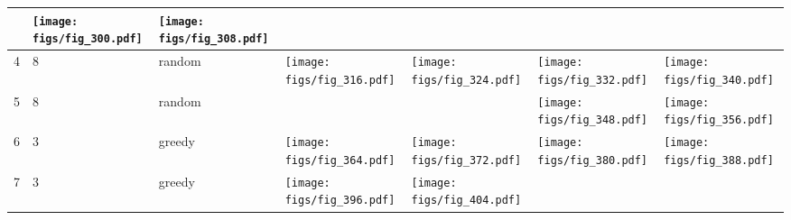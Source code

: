 \documentclass[oneside,canadian,landscape]{article}
\begin{document}
\begin{center}
\begin{longtable}{|l|l|l||l|l|l|l|}
\begin{minipage}{3.5cm}
\end{minipage}
&\begin{minipage}{3.5cm}
\texttt{[image: figs/fig\_300.pdf]}
\end{minipage}
&\begin{minipage}{3.5cm}
\texttt{[image: figs/fig\_308.pdf]}
\end{minipage}
\\ \hline
4&8&random&\begin{minipage}{3.5cm}
\texttt{[image: figs/fig\_316.pdf]}
\end{minipage}
&\begin{minipage}{3.5cm}
\texttt{[image: figs/fig\_324.pdf]}
\end{minipage}
&\begin{minipage}{3.5cm}
\texttt{[image: figs/fig\_332.pdf]}
\end{minipage}
&\begin{minipage}{3.5cm}
\texttt{[image: figs/fig\_340.pdf]}
\end{minipage}
\\ \hline
5&8&random&&&\begin{minipage}{3.5cm}
\texttt{[image: figs/fig\_348.pdf]}
\end{minipage}
&\begin{minipage}{3.5cm}
\texttt{[image: figs/fig\_356.pdf]}
\end{minipage}
\\ \hline
6&3&greedy&\begin{minipage}{3.5cm}
\texttt{[image: figs/fig\_364.pdf]}
\end{minipage}
&\begin{minipage}{3.5cm}
\texttt{[image: figs/fig\_372.pdf]}
\end{minipage}
&\begin{minipage}{3.5cm}
\texttt{[image: figs/fig\_380.pdf]}
\end{minipage}
&\begin{minipage}{3.5cm}
\texttt{[image: figs/fig\_388.pdf]}
\end{minipage}
\\ \hline
7&3&greedy&\begin{minipage}{3.5cm}
\texttt{[image: figs/fig\_396.pdf]}
\end{minipage}
&\begin{minipage}{3.5cm}
\texttt{[image: figs/fig\_404.pdf]}
\end{minipage}

\end{longtable}
\end{center}
\end{document}
